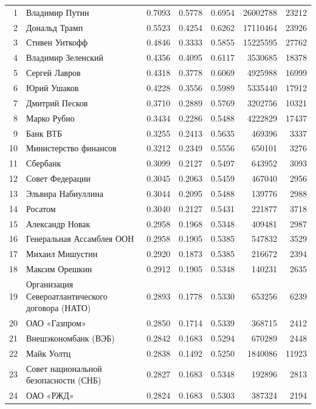 {\begin{longtable}{r >{\raggedright\arraybackslash}p{4.2cm} S[table-format=1.4] S[table-format=1.4] S[table-format=1.4] r r}
1 & Владимир Путин & 0.7093 & 0.5778 & 0.6954 & 26002788 & 23212 \\
2 & Дональд Трамп & 0.5523 & 0.4254 & 0.6262 & 17110464 & 23926 \\
3 & Стивен Уиткофф & 0.4846 & 0.3333 & 0.5855 & 15225595 & 27762 \\
4 & Владимир Зеленский & 0.4356 & 0.4095 & 0.6117 & 3530685 & 18378 \\
5 & Сергей Лавров & 0.4318 & 0.3778 & 0.6069 & 4925988 & 16999 \\
6 & Юрий Ушаков & 0.4228 & 0.3556 & 0.5989 & 5335440 & 17912 \\
7 & Дмитрий Песков & 0.3710 & 0.2889 & 0.5769 & 3202756 & 10321 \\
8 & Марко Рубио & 0.3434 & 0.2286 & 0.5488 & 4222829 & 17437 \\
9 & Банк ВТБ & 0.3255 & 0.2413 & 0.5635 & 469396 & 3337 \\
10 & Министерство финансов & 0.3212 & 0.2349 & 0.5556 & 650101 & 3276 \\
11 & Сбербанк & 0.3099 & 0.2127 & 0.5497 & 643952 & 3093 \\
12 & Совет Федерации & 0.3045 & 0.2063 & 0.5459 & 467040 & 2956 \\
13 & Эльвира Набиуллина & 0.3044 & 0.2095 & 0.5488 & 139776 & 2988 \\
14 & Росатом & 0.3040 & 0.2127 & 0.5431 & 221877 & 3718 \\
15 & Александр Новак & 0.2958 & 0.1968 & 0.5348 & 409481 & 2987 \\
16 & Генеральная Ассамблея ООН & 0.2958 & 0.1905 & 0.5385 & 547832 & 3529 \\
17 & Михаил Мишустин & 0.2920 & 0.1873 & 0.5385 & 216672 & 2394 \\
18 & Максим Орешкин & 0.2912 & 0.1905 & 0.5348 & 140231 & 2635 \\
19 & Организация Североатлантического договора (НАТО) & 0.2893 & 0.1778 & 0.5330 & 653256 & 6239 \\
20 & ОАО «Газпром» & 0.2850 & 0.1714 & 0.5339 & 368715 & 2412 \\
21 & Внешэкономбанк (ВЭБ) & 0.2842 & 0.1683 & 0.5294 & 670289 & 2448 \\
22 & Майк Уолтц & 0.2838 & 0.1492 & 0.5250 & 1840086 & 11923 \\
23 & Совет национальной безопасности (СНБ) & 0.2827 & 0.1683 & 0.5348 & 192896 & 2813 \\
24 & ОАО «РЖД» & 0.2824 & 0.1683 & 0.5303 & 387324 & 2194 \\

\end{longtable}}
